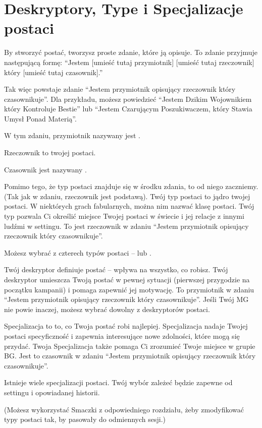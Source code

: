 \section{Deskryptory, Type i Specjalizacje postaci}

By stworzyć postać, tworzysz proste zdanie, które ją opisuje. To zdanie przyjmuje następującą formę: “Jestem [umieść tutaj przymiotnik] [umieść tutaj rzeczownik] który [umieść tutaj czasownik].”

Tak więc powstaje zdanie “Jestem przymiotnik opisujący rzeczownik który czasownikuje”. Dla przykładu, możesz powiedzieć “Jestem Dzikim Wojownikiem który Kontroluje Bestie” lub “Jestem Czarującym Poszukiwaczem, który Stawia Umysł Ponad Materią”. 

W tym zdaniu, przymiotnik nazywany jest .

Rzeczownik to  twojej postaci.

Czasownik jest nazywany .

Pomimo tego, że typ postaci znajduje się w środku zdania, to od niego zaczniemy. (Tak jak w zdaniu, rzeczownik jest podstawą).
Twój typ postaci to jądro twojej postaci. W niektórych grach fabularnych, można nim nazwać klasę postaci. Twój typ pozwala Ci określić miejsce Twojej postaci w świecie i jej relacje z innymi ludźmi w settingu. To jest rzeczownik w zdaniu “Jestem przymiotnik opisujący rzeczownik który czasownikuje”.

Możesz wybrać z czterech typów postaci –  lub .

Twój deskryptor definiuje postać – wpływa na wszystko, co robisz. Twój deskryptor umieszcza Twoją postać w pewnej sytuacji (pierwszej przygodzie na początku kampanii) i pomaga zapewnić jej motywację. To przymiotnik w zdaniu “Jestem przymiotnik opisujący rzeczownik który czasownikuje”.
Jeśli Twój MG nie powie inaczej, możesz wybrać dowolny z deskryptorów postaci.

Specjalizacja to to, co Twoja postać robi najlepiej. Specjalizacja nadaje Twojej postaci specyficzność i zapewnia interesujące nowe zdolności, które mogą się przydać. Twoja Specjalizacja także pomaga Ci zrozumieć Twoje miejsce w grupie BG. Jest to czasownik w zdaniu “Jestem przymiotnik opisujący rzeczownik który czasownikuje”.

Istnieje wiele specjalizacji postaci. Twój wybór zależeć będzie zapewne od settingu i opowiadanej historii.

(Możesz wykorzystać Smaczki z odpowiedniego rozdziału, żeby zmodyfikować typy postaci tak, by pasowały do odmiennych sesji.)

